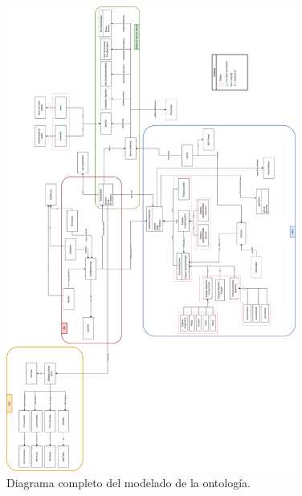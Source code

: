 \documentclass[a4paper,12pt]{article}
\begin{document}
		\begin{figure}[H]
		\centering
		\includegraphics[width=0.85\textwidth]{include/diagrama_modelo_completo.png}
		\caption{Diagrama completo del modelado de la ontología.}
	\end{figure}
	
\end{document}
